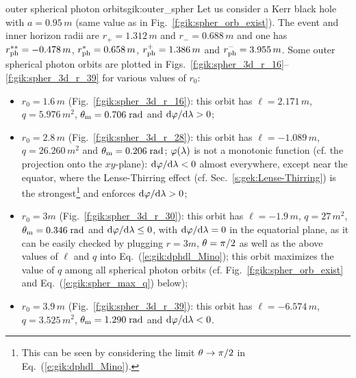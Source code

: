 \begin{texample}{outer spherical photon orbits}{gik:outer_spher}
Let us consider a Kerr black hole with $a=0.95\, m$ (same value as in
Fig.~\ref{f:gik:spher_orb_exist}). The event and inner horizon radii
are $r_+ = 1.312\, m$ and $r_- = 0.688\, m$ and one has
$r_{\rm ph}^{**} = - 0.478\, m$, $r_{\rm ph}^{*} = 0.658\, m$,
$r_{\rm ph}^+ = 1.386\, m$ and $r_{\rm ph}^- = 3.955\, m$.
Some outer spherical photon orbits are plotted in
Figs.~\ref{f:gik:spher_3d_r_16}--\ref{f:gik:spher_3d_r_39}
for various values of $r_0$:
\begin{itemize}
\item $r_0 = 1.6\, m$ (Fig.~\ref{f:gik:spher_3d_r_16}): this orbit
has $\ell = 2.171\, m$, $q=5.976\, m^2$, $\theta_{\rm m} = 0.706\;{\rm rad}$ and $\mathrm{d}\varphi/\mathrm{d}\lambda > 0$;
\item $r_0 = 2.8\, m$ (Fig.~\ref{f:gik:spher_3d_r_28}): this orbit
has $\ell = -1.089\, m$, $q=26.260\, m^2$ and $\theta_{\rm m} = 0.206\;{\rm rad}$;
$\varphi(\lambda)$ is not a monotonic function (cf. the projection onto the $xy$-plane):
$\mathrm{d}\varphi/\mathrm{d}\lambda < 0$ almost everywhere, except
near the equator, where the Lense-Thirring effect (cf. Sec.~\ref{s:gek:Lense-Thirring})
is the strongest\footnote{This can be seen
by considering the limit $\theta\to\pi/2$ in Eq.~(\ref{e:gik:dphdl_Mino}).} and
enforces $\mathrm{d}\varphi/\mathrm{d}\lambda > 0$;
\item $r_0 = 3 m$ (Fig.~\ref{f:gik:spher_3d_r_30}): this orbit
has $\ell = -1.9\, m$, $q=27\, m^2$, $\theta_{\rm m} = 0.346\;{\rm rad}$ and
$\mathrm{d}\varphi/\mathrm{d}\lambda \leq 0$, with $\mathrm{d}\varphi/\mathrm{d}\lambda = 0$ in the equatorial plane,
as it can be easily checked by plugging $r=3m$, $\theta=\pi/2$ as well as
the above values of $\ell$ and $q$ into Eq.~(\ref{e:gik:dphdl_Mino});
this orbit maximizes the value of $q$ among all spherical photon orbits
(cf. Fig.~\ref{f:gik:spher_orb_exist} and Eq.~(\ref{e:gik:spher_max_q}) below);
\item $r_0 = 3.9\, m$ (Fig.~\ref{f:gik:spher_3d_r_39}): this orbit
has $\ell = -6.574\, m$, $q=3.525\, m^2$, $\theta_{\rm m} = 1.290\;{\rm rad}$
and $\mathrm{d}\varphi/\mathrm{d}\lambda < 0$.
\end{itemize}
\end{texample}

